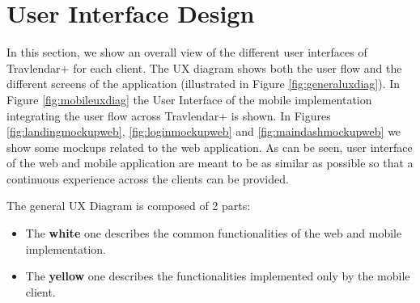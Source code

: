 \chapter{User Interface Design}
\label{cha:ui}
In this section, we show an overall view of the different user interfaces of Travlendar+ for each client. The UX diagram shows both the user flow and the different screens of the application (illustrated in Figure \ref{fig:generaluxdiag}). 
In Figure \ref{fig:mobileuxdiag} the User Interface of the mobile implementation integrating the user flow across Travlendar+ is shown. In Figures \ref{fig:landingmockupweb}, \ref{fig:loginmockupweb} and \ref{fig:maindashmockupweb} we show some mockups related to the web application. As can be seen, user interface of the web and mobile application are meant to be as similar as possible so that a continuous experience across the clients can be provided.

The general UX Diagram is composed of 2 parts:
\begin{itemize}
\item The \textbf{white} one describes the common functionalities of the web and mobile implementation.
\item The \textbf{yellow} one describes the functionalities implemented only by the mobile client.
\end{itemize}



